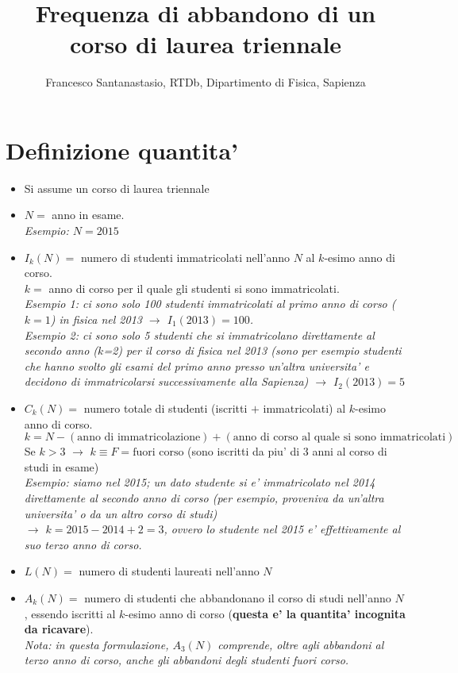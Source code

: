 \documentclass[a4paper,11pt]{article}
\title{Frequenza di abbandono di un corso di laurea triennale}
\author{Francesco Santanastasio, RTDb, Dipartimento di Fisica, Sapienza}
\begin{document}
\maketitle

\section{Definizione quantita'}

\begin{itemize}
\item Si assume un corso di laurea triennale
\item $N = $ anno in esame. \\
{\it Esempio: $N = 2015$}
\item $I_k(N) = $ numero di studenti immatricolati nell'anno $N$ al $k$-esimo anno di corso. \\
$k = $ anno di corso per il quale gli studenti si sono immatricolati.\\
{\it Esempio 1: ci sono solo 100 studenti immatricolati al primo anno di corso ($k=1$) in fisica nel 2013 $\rightarrow$ $I_1(2013) = 100 $.} \\
{\it Esempio 2: ci sono solo 5 studenti che si immatricolano direttamente al secondo anno ($k$=2) per il corso di fisica nel 2013 (sono per esempio studenti che hanno svolto gli esami del primo anno presso un'altra universita' e decidono di immatricolarsi successivamente alla Sapienza) $\rightarrow$ $I_2(2013) = 5 $}
\item $C_k(N) = $ numero totale di studenti (iscritti $+$ immatricolati) al $k$-esimo anno di corso.\\
$k = N - (\mbox{anno di immatricolazione}) + (\mbox{anno di corso al quale si sono immatricolati})$ \\
Se $k>3$ $\rightarrow$ $k \equiv F = \mbox{fuori corso}$ (sono iscritti da piu' di 3 anni al corso di studi in esame)\\
{\it Esempio: siamo nel 2015; un dato studente si e' immatricolato nel 2014 direttamente al secondo anno di corso (per esempio, proveniva da un'altra universita' o da un altro corso di studi)} \\ 
{\it $\rightarrow$ $k=2015 - 2014 + 2 = 3$, ovvero lo studente nel 2015 e' effettivamente al suo terzo anno di corso.}
\item $L(N) = $ numero di studenti laureati nell'anno $N$
\item $A_k(N) = $ numero di studenti che abbandonano il corso di studi nell'anno $N$, essendo iscritti al $k$-esimo anno di corso ({\bf questa e' la quantita' incognita da ricavare}).\\
{\it Nota: in questa formulazione, $A_3(N)$ comprende, oltre agli
  abbandoni al terzo anno di corso, anche gli abbandoni degli studenti fuori corso.}
\end{itemize} 
\end{document}
